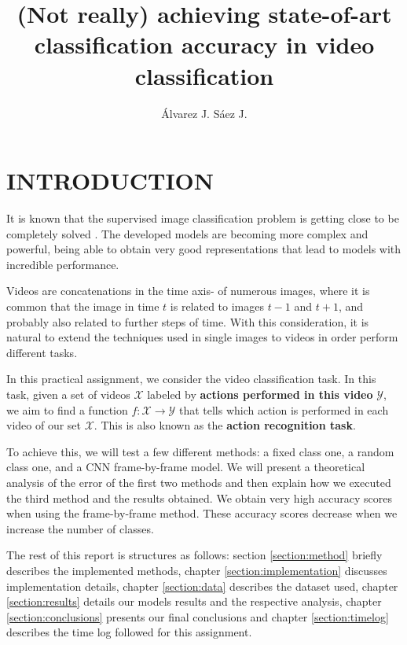 \documentclass[letterpaper, 10 pt, conference]{ieeeconf}
\title{\LARGE \bf  (Not really) achieving state-of-art classification accuracy in video classification}
\author{Álvarez J. Sáez J.}
\begin{document}
\maketitle
\thispagestyle{headings}
\pagestyle{headings}

\section{INTRODUCTION}

It is known that the supervised image classification problem is getting close to be completely solved \cite{COCA}. The developed models are becoming more complex and powerful, being able to obtain very good representations that lead to models with incredible performance.

Videos are concatenations in the time axis- of numerous images, where it is common that the image in time \(t\) is related to images \(t-1\) and \(t+1\), and probably also related to further steps of time. With this consideration, it is natural to extend the techniques used in single images to videos in order perform different tasks. 

In this practical assignment, we consider the video classification task. In this task, given a set of videos \(\mathcal X\) labeled by \textbf{actions performed in this video} \(\mathcal Y\), we aim to find a function \(f: \mathcal X \to \mathcal Y\) that tells which action is performed in each video of our set \(\mathcal X\). This is also known as the \textbf{action recognition task}.

To achieve this, we will test a few different methods: a fixed class one, a random class one, and a CNN frame-by-frame model. We will present a theoretical analysis of the error of the first two methods and then explain how we executed the third method and the results obtained. We obtain very high accuracy scores when using the frame-by-frame method. These accuracy scores decrease when we increase the number of classes.

The rest of this report is structures as follows: section \ref{section:method} briefly describes the implemented methods, chapter \ref{section:implementation} discusses implementation details, chapter \ref{section:data} describes the dataset used, chapter \ref{section:results} details our models results and the respective analysis, chapter \ref{section:conclusions} presents our final conclusions and chapter \ref{section:timelog} describes the time log followed for this assignment.
\end{document}
